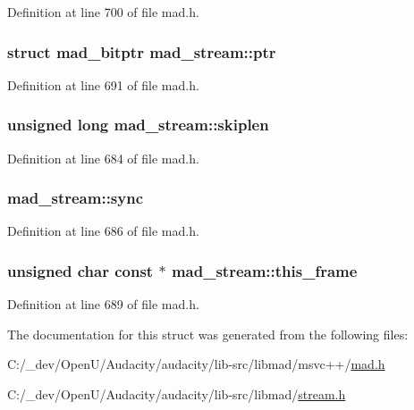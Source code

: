 Definition at line 700 of file mad.\+h.

\subsubsection[{\texorpdfstring{ptr}{ptr}}]{\setlength{\rightskip}{0pt plus 5cm}struct {\bf mad\+\_\+bitptr} mad\+\_\+stream\+::ptr}\hypertarget{structmad__stream_a987cf5a3e8ab950311e7afeda3ef34db}{}\label{structmad__stream_a987cf5a3e8ab950311e7afeda3ef34db}


Definition at line 691 of file mad.\+h.

\subsubsection[{\texorpdfstring{skiplen}{skiplen}}]{\setlength{\rightskip}{0pt plus 5cm}unsigned long mad\+\_\+stream\+::skiplen}\hypertarget{structmad__stream_a380775f9816d642c8de9eb0f80b6ac01}{}\label{structmad__stream_a380775f9816d642c8de9eb0f80b6ac01}


Definition at line 684 of file mad.\+h.

\subsubsection[{\texorpdfstring{sync}{sync}}]{ mad\+\_\+stream\+::sync}\hypertarget{structmad__stream_a1f11c60768caff2595ce4c94b1172d5a}{}\label{structmad__stream_a1f11c60768caff2595ce4c94b1172d5a}


Definition at line 686 of file mad.\+h.

\subsubsection[{\texorpdfstring{this\+\_\+frame}{this_frame}}]{\setlength{\rightskip}{0pt plus 5cm}unsigned char {\bf const} $\ast$ mad\+\_\+stream\+::this\+\_\+frame}\hypertarget{structmad__stream_a7618e13aaba1d5817d30f3aea45a3c3c}{}\label{structmad__stream_a7618e13aaba1d5817d30f3aea45a3c3c}


Definition at line 689 of file mad.\+h.



The documentation for this struct was generated from the following files\+:\begin{DoxyCompactItemize}
\item 
C\+:/\+\_\+dev/\+Open\+U/\+Audacity/audacity/lib-\/src/libmad/msvc++/\hyperlink{lib-src_2libmad_2msvc_09_09_2mad_8h}{mad.\+h}\item 
C\+:/\+\_\+dev/\+Open\+U/\+Audacity/audacity/lib-\/src/libmad/\hyperlink{stream_8h}{stream.\+h}\end{DoxyCompactItemize}
